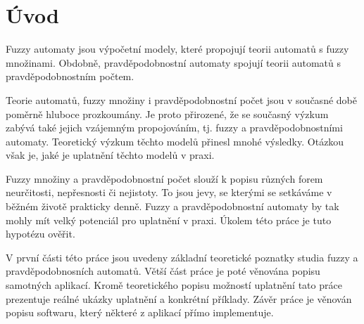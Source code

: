 % 
% 
% 
% 
% 
% 

\section{Úvod}
Fuzzy automaty jsou výpočetní modely, které propojují teorii automatů s fuzzy množinami. Obdobně, pravděpodobnostní automaty spojují teorii automatů s pravděpodobnostním počtem.

Teorie automatů, fuzzy množiny i pravděpodobnostní počet jsou v současné době poměrně hluboce prozkoumány. Je proto přirozené, že se současný výzkum zabývá také jejich vzájemným propojováním, tj. fuzzy a pravděpodobnostními automaty. Teoretický výzkum těchto modelů přinesl mnohé výsledky. Otázkou však je, jaké je uplatnění těchto modelů v praxi.

Fuzzy množiny a pravděpodobnostní počet slouží k popisu různých forem neurčitosti, nepřesnosti či nejistoty. To jsou jevy, se kterými se setkáváme v běžném životě prakticky denně. Fuzzy a pravděpodobnostní automaty by tak mohly mít velký potenciál pro uplatnění v praxi. Úkolem této práce je tuto hypotézu ověřit.

V první části této práce jsou uvedeny základní teoretické poznatky studia fuzzy a pravděpodobnosních automatů. Větší část práce je poté věnována popisu samotných aplikací. Kromě teoretického popisu možností uplatnění tato práce prezentuje reálné ukázky uplatnění a konkrétní příklady. Závěr práce je věnován popisu softwaru, který některé z aplikací přímo implementuje.


